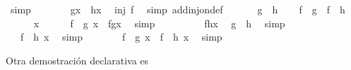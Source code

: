 \begin{isabellebody}
\ simp\isanewline
\ \ \ \ \isamarkupfalse%
\ \isamarkupfalse%
\ {\isachardoublequoteopen}g{\isacharparenleft}x{\isacharparenright}\ {\isacharequal}\ h{\isacharparenleft}x{\isacharparenright}{\isachardoublequoteclose}\ \isamarkupfalse%
\ {\isacharbackquoteopen}inj\ f{\isacharbackquoteclose}\ \isamarkupfalse%
\ {\isacharparenleft}simp\ add{\isacharcolon}inj{\isacharunderscore}on{\isacharunderscore}def{\isacharparenright}\isanewline
\ \ \isamarkupfalse%
\isanewline
{}\isamarkupfalse%
\isanewline
\ \ \isamarkupfalse%
\ {\isachardoublequoteopen}g\ {\isacharequal}\ h{\isachardoublequoteclose}\isanewline
\ \ \isamarkupfalse%
\ {\isachardoublequoteopen}f\ {\isasymcirc}\ g\ {\isacharequal}\ f\ {\isasymcirc}\ h{\isachardoublequoteclose}\isanewline
\ \ \isamarkupfalse%
\isanewline
\ \ \ \ \isamarkupfalse%
\ x\isanewline
\ \ \ \ \isamarkupfalse%
\ {\isachardoublequoteopen}{\isacharparenleft}f\ {\isasymcirc}\ g{\isacharparenright}\ x\ {\isacharequal}\ f{\isacharparenleft}g{\isacharparenleft}x{\isacharparenright}{\isacharparenright}{\isachardoublequoteclose}\ \isamarkupfalse%
\ simp\isanewline
\ \ \ \ \isamarkupfalse%
\ \isamarkupfalse%
\ {\isachardoublequoteopen}{\isasymdots}\ {\isacharequal}\ f{\isacharparenleft}h{\isacharparenleft}x{\isacharparenright}{\isacharparenright}{\isachardoublequoteclose}\ \isamarkupfalse%
\ {\isacharbackquoteopen}g\ {\isacharequal}\ h{\isacharbackquoteclose}\ \isamarkupfalse%
\ simp\isanewline
\ \ \ \ \isamarkupfalse%
\ \isamarkupfalse%
\ {\isachardoublequoteopen}{\isasymdots}\ {\isacharequal}\ {\isacharparenleft}f\ {\isasymcirc}\ h{\isacharparenright}\ x{\isachardoublequoteclose}\ \isamarkupfalse%
\ simp\isanewline
\ \ \ \ \isamarkupfalse%
\ \isamarkupfalse%
\ {\isachardoublequoteopen}{\isacharparenleft}f\ {\isasymcirc}\ g{\isacharparenright}\ x\ {\isacharequal}\ {\isacharparenleft}f\ {\isasymcirc}\ h{\isacharparenright}\ x{\isachardoublequoteclose}\ \isamarkupfalse%
\ simp\isanewline
\ \ \isamarkupfalse%
\isanewline
{}\isamarkupfalse%
%
\endisatagproof
{\isafoldproof}%
%
\isadelimproof
%
\endisadelimproof
%
\begin{isamarkuptext}%
Otra demostración declarativa es%
\end{isamarkuptext}\isamarkuptrue%

\end{isabellebody}
